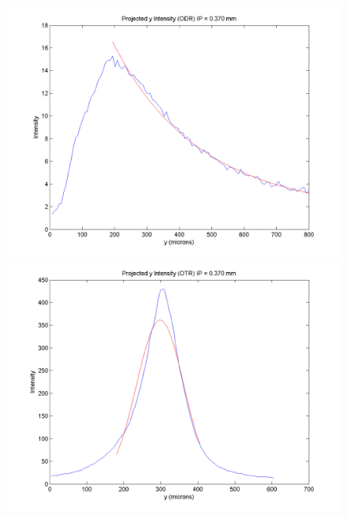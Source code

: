 \documentclass[12pt]{article}
\begin{document}
\begin{figure}
\begin{center}
\includegraphics[scale=0.5]{Figures/ProjY_ODR_370.PNG}
\includegraphics[scale=0.5]{Figures/ProjY_OTR_370.PNG}
\caption{}
\end{center}
\end{figure}
\end{document}
